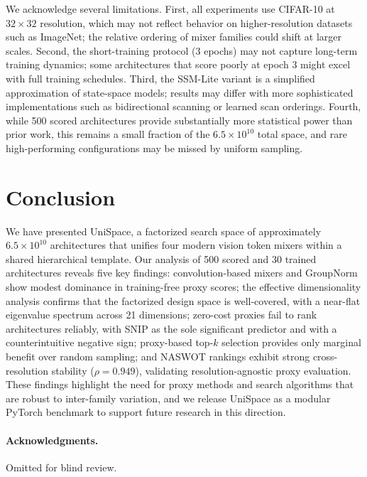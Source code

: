 \documentclass[10pt,twocolumn,letterpaper]{article}
\newcommand{\method}{UniSpace\xspace}
\newcommand{\naswot}{NASWOT\xspace}
\begin{document}
We acknowledge several limitations. First, all experiments use CIFAR-10 at $32 \times 32$ resolution, which may not reflect behavior on higher-resolution datasets such as ImageNet; the relative ordering of mixer families could shift at larger scales. Second, the short-training protocol (3 epochs) may not capture long-term training dynamics; some architectures that score poorly at epoch 3 might excel with full training schedules. Third, the SSM-Lite variant is a simplified approximation of state-space models; results may differ with more sophisticated implementations such as bidirectional scanning or learned scan orderings. Fourth, while 500 scored architectures provide substantially more statistical power than prior work, this remains a small fraction of the $6.5 \times 10^{10}$ total space, and rare high-performing configurations may be missed by uniform sampling.

\section{Conclusion}
\label{sec:conclusion}

We have presented \method, a factorized search space of approximately $6.5 \times 10^{10}$ architectures that unifies four modern vision token mixers within a shared hierarchical template. Our analysis of 500 scored and 30 trained architectures reveals five key findings: convolution-based mixers and GroupNorm show modest dominance in training-free proxy scores; the effective dimensionality analysis confirms that the factorized design space is well-covered, with a near-flat eigenvalue spectrum across 21 dimensions; zero-cost proxies fail to rank architectures reliably, with SNIP as the sole significant predictor and with a counterintuitive negative sign; proxy-based top-$k$ selection provides only marginal benefit over random sampling; and \naswot rankings exhibit strong cross-resolution stability ($\rho = 0.949$), validating resolution-agnostic proxy evaluation. These findings highlight the need for proxy methods and search algorithms that are robust to inter-family variation, and we release \method as a modular PyTorch benchmark to support future research in this direction.

\paragraph{Acknowledgments.} Omitted for blind review.
\end{document}
